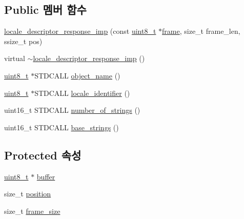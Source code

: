 \subsection*{Public 멤버 함수}
\begin{DoxyCompactItemize}
\item 
\hyperlink{classavdecc__lib_1_1locale__descriptor__response__imp_a73c512d21acbbc713fdf10b5619b6b18}{locale\+\_\+descriptor\+\_\+response\+\_\+imp} (const \hyperlink{stdint_8h_aba7bc1797add20fe3efdf37ced1182c5}{uint8\+\_\+t} $\ast$\hyperlink{gst__avb__playbin_8c_ac8e710e0b5e994c0545d75d69868c6f0}{frame}, size\+\_\+t frame\+\_\+len, ssize\+\_\+t pos)
\item 
virtual \hyperlink{classavdecc__lib_1_1locale__descriptor__response__imp_abf4a773d65086543607e0d077245e18e}{$\sim$locale\+\_\+descriptor\+\_\+response\+\_\+imp} ()
\item 
\hyperlink{stdint_8h_aba7bc1797add20fe3efdf37ced1182c5}{uint8\+\_\+t} $\ast$S\+T\+D\+C\+A\+LL \hyperlink{classavdecc__lib_1_1locale__descriptor__response__imp_a15837e3eb254ad44812cb766ae8cd53c}{object\+\_\+name} ()
\item 
\hyperlink{stdint_8h_aba7bc1797add20fe3efdf37ced1182c5}{uint8\+\_\+t} $\ast$S\+T\+D\+C\+A\+LL \hyperlink{classavdecc__lib_1_1locale__descriptor__response__imp_a73ed00097c7913546385f134673dd5e4}{locale\+\_\+identifier} ()
\item 
uint16\+\_\+t S\+T\+D\+C\+A\+LL \hyperlink{classavdecc__lib_1_1locale__descriptor__response__imp_accb2ed7efb1cbbb1b081c4b83b065772}{number\+\_\+of\+\_\+strings} ()
\item 
uint16\+\_\+t S\+T\+D\+C\+A\+LL \hyperlink{classavdecc__lib_1_1locale__descriptor__response__imp_ae30caf6959bab45b8d979dfde6a7fdf5}{base\+\_\+strings} ()
\end{DoxyCompactItemize}
\subsection*{Protected 속성}
\begin{DoxyCompactItemize}
\item 
\hyperlink{stdint_8h_aba7bc1797add20fe3efdf37ced1182c5}{uint8\+\_\+t} $\ast$ \hyperlink{classavdecc__lib_1_1descriptor__response__base__imp_a56ed84df35de10bdb65e72b184309497}{buffer}
\item 
size\+\_\+t \hyperlink{classavdecc__lib_1_1descriptor__response__base__imp_a7a04afe5347934be732ec70a70bd0a28}{position}
\item 
size\+\_\+t \hyperlink{classavdecc__lib_1_1descriptor__response__base__imp_affd041a595cabab98275245b9cb2824d}{frame\+\_\+size}
\end{DoxyCompactItemize}


